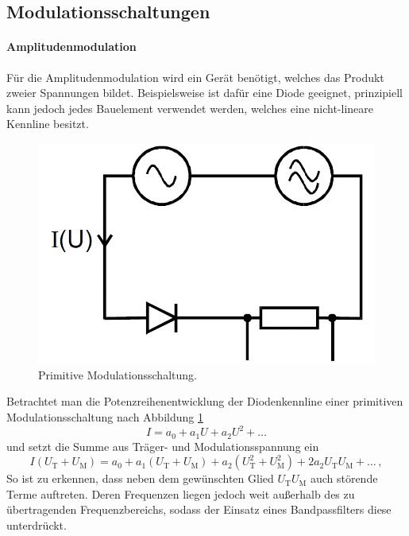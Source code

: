 \subsection{Modulationsschaltungen}
\label{subsec:debye}

\paragraph{Amplitudenmodulation}
Für die Amplitudenmodulation wird ein Gerät benötigt, welches das Produkt zweier Spannungen bildet.
Beispielsweise ist dafür eine Diode geeignet, prinzipiell kann jedoch jedes Bauelement verwendet werden, welches eine nicht-lineare Kennline besitzt.

\begin{figure}[!h]
    \centering
    \includegraphics[width = 14cm]{images/modulationsschaltung.png}
    \caption{Primitive Modulationsschaltung.}
    \label{modulationsschaltung_einfach}
\end{figure}

Betrachtet man die Potenzreihenentwicklung der Diodenkennline einer primitiven Modulationsschaltung nach Abbildung \ref{modulationsschaltung_einfach}
\begin{equation*}
    I = a_0 + a_1 U + a_2 U^2 + \dots
\end{equation*}
und setzt die Summe aus Träger- und Modulationsspannung ein
\begin{equation*}
    I ( U_\text{T} + U_\text{M} ) = a_0 + a_1 ( U_\text{T} + U_\text{M} ) + a_2 ( U_\text{T}^2 + U_\text{M}^2 ) + 2 a_2 U_\text{T} U_\text{M} + \dots \,,
\end{equation*}
So ist zu erkennen, dass neben dem gewünschten Glied $U_\text{T} U_\text{M}$ auch störende Terme auftreten.
Deren Frequenzen liegen jedoch weit außerhalb des zu übertragenden Frequenzbereichs, sodass der Einsatz eines Bandpassfilters diese unterdrückt.

